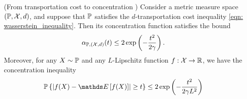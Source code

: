 \documentclass[11pt]{article}
\begin{document}
\begin{itemize}
\begin{theorem}(From transportation cost to concentration \citep{wainwright2019high}) Consider a metric measure space $({\mathbb P}, {\mathcal X}, d)$, and suppose that ${\mathbb P}$ satisfies the $d$-transportation cost inequality \eqref{eqn: wasserstein_inequality}. Then its concentration function satisfies the bound
\begin{align}
\alpha_{{\mathbb P},({\mathcal X},d)}(t) &\le 2\exp\left(-\frac{t^2}{2 \gamma}\right).  \label{eqn: wasserstein_concentration_1}
\end{align}
Moreover, for any $X \sim {\mathbb P}$ and any $L$-Lipschitz function $f : {\mathcal X} \rightarrow {\mathbb R}$, we have the concentration inequality
\begin{align}
\bP\set{\abs{f(X)  - \E{}{f(X)} } \ge t} &\le 2\exp\paren{-\frac{t^2}{2 \gamma L^2}} \label{eqn: wasserstein_concentration_2}
\end{align}
\end{theorem}

\end{itemize}
\end{document}
